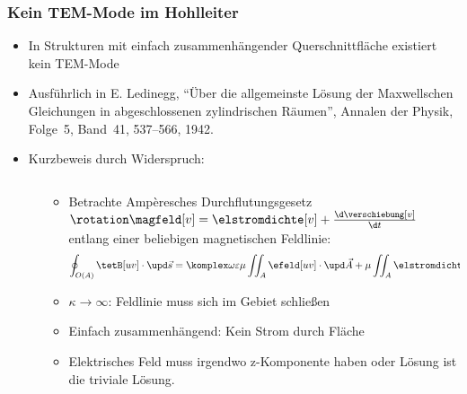 \begin{frame}
  \frametitle{Kein TEM-Mode im Hohlleiter}
  \begin{itemize}[<+->]
  \item In Strukturen mit \alert{einfach zusammenhängender Querschnittfläche} existiert kein TEM-Mode
    \item Ausführlich in E. Ledinegg, \enquote{Über die allgemeinste Lösung der Maxwellschen Gleichungen in abgeschlossenen zylindrischen Räumen}, Annalen der Physik, Folge~5, Band~41, 537--566, 1942.
\item Kurzbeweis durch Widerspruch:
  \begin{columns}
    \begin{column}{.35\textwidth}
          \end{column}
    \begin{column}{.65\textwidth}
  \begin{itemize}[<+->]
  \item Betrachte Ampèresches Durchflutungsgesetz \(\rotation\magfeld[v]=\elstromdichte[v]+\frac{\d \verschiebung[v]}{\d t}\) entlang einer beliebigen magnetischen Feldlinie:
    \begin{equation*}
      \oint_{O(A)} \tetB[uv] \cdot \upd\vec{s} = \komplex\omega\varepsilon\mu \iint_{A} \efeld[uv]\cdot\upd\vec{A} + \mu\iint_{A} \elstromdichte[uv]\cdot\upd\vec{A}
    \end{equation*}
  \item \(\kappa\to\infty\): Feldlinie muss sich im Gebiet schließen
  \item Einfach zusammenhängend: Kein Strom durch Fläche
    \item Elektrisches Feld muss irgendwo z-Komponente haben oder Lösung ist die triviale Lösung.
  \end{itemize}
          \end{column}
\end{columns}    
\end{itemize}
\ 
\end{frame}

